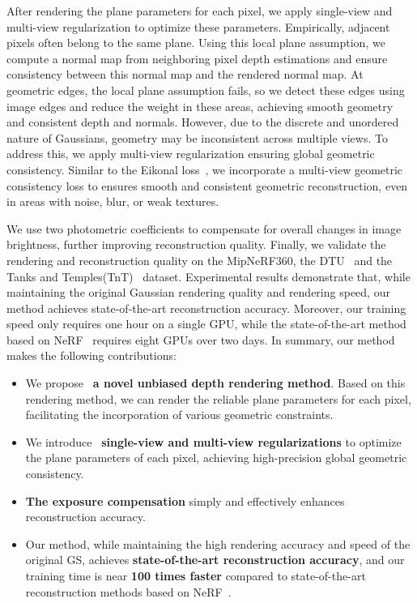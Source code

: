 \documentclass[lettersize,journal]{IEEEtran}
\begin{document}
After rendering the plane parameters for each pixel, we apply single-view and multi-view regularization to optimize these parameters. Empirically, adjacent pixels often belong to the same plane. Using this local plane assumption, we compute a normal map from neighboring pixel depth estimations and ensure consistency between this normal map and the rendered normal map. At geometric edges, the local plane assumption fails, so we detect these edges using image edges and reduce the weight in these areas, achieving smooth geometry and consistent depth and normals. However, due to the discrete and unordered nature of Gaussians, geometry may be inconsistent across multiple views. To address this, we apply multi-view regularization ensuring global geometric consistency. Similar to the Eikonal loss~\cite{wang2021neus}, we incorporate a multi-view geometric consistency loss to ensures smooth and consistent geometric reconstruction, even in areas with noise, blur, or weak textures. 

We use two photometric coefficients to compensate for overall changes in image brightness, further improving reconstruction quality. 
Finally, we validate the rendering and reconstruction quality on the MipNeRF360, the DTU~\cite{jensen2014large} and the Tanks and Temples(TnT)~\cite{knapitsch2017tanks} dataset. Experimental results demonstrate that, while maintaining the original Gaussian rendering quality and rendering speed, our method achieves state-of-the-art reconstruction accuracy. Moreover, our training speed only requires one hour on a single GPU, while the state-of-the-art method based on NeRF~\cite{li2023neuralangelo} requires eight GPUs over two days. In summary, our method makes the following contributions:

\begin{itemize}
  \item We propose ~\textbf{a novel unbiased depth rendering method}. Based on this rendering method, we can render the reliable plane parameters for each pixel, facilitating the incorporation of various geometric constraints.
  \item We introduce ~\textbf{single-view and multi-view regularizations} to optimize the plane parameters of each pixel, achieving high-precision global geometric consistency.
  \item \textbf{The exposure compensation} simply and effectively enhances reconstruction accuracy. 
  \item Our method, while maintaining the high rendering accuracy and speed of the original GS, achieves \textbf{state-of-the-art reconstruction accuracy}, and our training time is near \textbf{100 times faster} compared to state-of-the-art reconstruction methods based on NeRF~\cite{li2023neuralangelo}.
\end{itemize}
\end{document}
